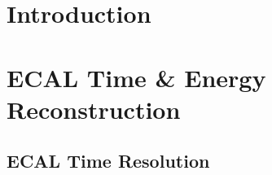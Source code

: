 \documentclass{cmspaper}
\begin{document}
%
%
%
%
%  
%

\pagebreak

%

\section{Introduction \label{sec:intro}}

\FloatBarrier

\section{ECAL Time \& Energy Reconstruction \label{sec:reco}}

 
\subsection{ECAL Time Resolution \label{sec:reso}}

\end{document}
